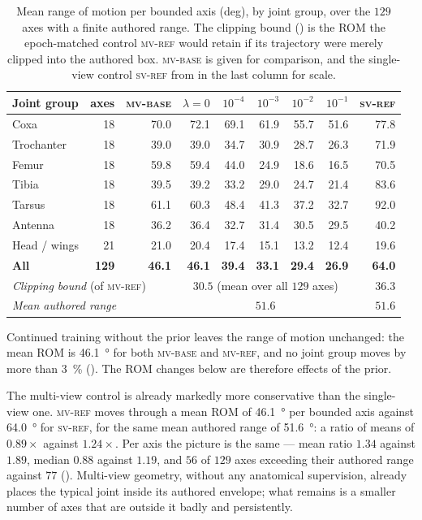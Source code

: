 \documentclass[11pt,a4paper]{article}
\newcommand{\lam}{\lambda}
\newcommand{\armref}{\textsc{mv-ref}}
\newcommand{\armbase}{\textsc{mv-base}}
\newcommand{\svref}{\textsc{sv-ref}}
\begin{document}
\begin{table}[t]
\centering
\small
\caption{Mean range of motion per bounded axis (deg), by joint group, over the
$129$ axes with a finite authored range. The clipping bound () is
the ROM the epoch-matched control \armref{} would retain if its trajectory were
merely clipped into the authored box. \armbase{} is given for comparison, and
the single-view control \svref{} from \cite{sv} in the last column for scale.}
\label{tab:rom}
\setlength{\tabcolsep}{4.2pt}
\begin{tabular}{l r r *{5}{r} r}
\toprule
Joint group & axes & \armbase{} & $\lam{=}0$ & $10^{-4}$ & $10^{-3}$ & $10^{-2}$ & $10^{-1}$ & \svref{} \\
\midrule
Coxa            & 18 & 70.0 & 72.1 & 69.1 & 61.9 & 55.7 & 51.6 & 77.8 \\
Trochanter      & 18 & 39.0 & 39.0 & 34.7 & 30.9 & 28.7 & 26.3 & 71.9 \\
Femur           & 18 & 59.8 & 59.4 & 44.0 & 24.9 & 18.6 & 16.5 & 70.5 \\
Tibia           & 18 & 39.5 & 39.2 & 33.2 & 29.0 & 24.7 & 21.4 & 83.6 \\
Tarsus          & 18 & 61.1 & 60.3 & 48.4 & 41.3 & 37.2 & 32.7 & 92.0 \\
Antenna         & 18 & 36.2 & 36.4 & 32.7 & 31.4 & 30.5 & 29.5 & 40.2 \\
Head / wings    & 21 & 21.0 & 20.4 & 17.4 & 15.1 & 13.2 & 12.4 & 19.6 \\
\midrule
\textbf{All}    & \textbf{129} & \textbf{46.1} & \textbf{46.1} & \textbf{39.4} & \textbf{33.1} & \textbf{29.4} & \textbf{26.9} & \textbf{64.0} \\
\midrule
\multicolumn{3}{l}{\emph{Clipping bound} (of \armref{})} & \multicolumn{5}{c}{$30.5$ (mean over all $129$ axes)} & $36.3$ \\
\multicolumn{3}{l}{\emph{Mean authored range}} & \multicolumn{5}{c}{$51.6$} & $51.6$ \\
\bottomrule
\end{tabular}
\end{table}

Continued training without the prior leaves the range of motion unchanged:
the mean ROM is \SI{46.1}{\degree} for both \armbase{} and \armref{}, and no
joint group moves by more than \SI{3}{\percent} (). The ROM
changes below are therefore effects of the prior.

The multi-view control is already markedly more conservative than the
single-view one. \armref{} moves through a mean ROM of \SI{46.1}{\degree} per
bounded axis against \SI{64.0}{\degree} for \svref{}, for the same mean
authored range of \SI{51.6}{\degree}: a ratio of means of $0.89\times$ against
$1.24\times$. Per axis the picture is the same --- mean ratio $1.34$ against
$1.89$, median $0.88$ against $1.19$, and $56$ of $129$ axes exceeding their
authored range against $77$ (). Multi-view geometry, without
any anatomical supervision, already places the typical joint inside its
authored envelope; what remains is a smaller number of axes that are outside it
badly and persistently.
\end{document}
